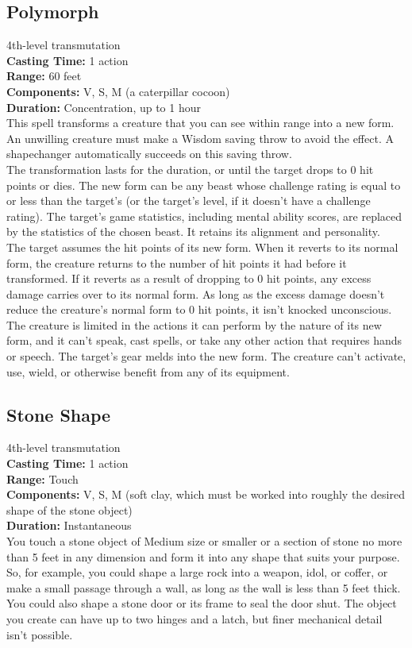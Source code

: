 \documentclass[11pt, A4paper, english]{article}
\begin{document}
		\subsection{Polymorph}
4th-level transmutation \\
\textbf{Casting Time:} 1 action \\
\textbf{Range:} 60 feet \\
\textbf{Components:} V, S, M (a caterpillar cocoon) \\
\textbf{Duration:} Concentration, up to 1 hour \\
This spell transforms a creature that you can see within range into a new form. An unwilling creature must make a Wisdom saving throw to avoid the effect. A shapechanger automatically succeeds on this saving throw. \\
The transformation lasts for the duration, or until the target drops to 0 hit points or dies. The new form can be any beast whose challenge rating is equal to or less than the target’s (or the target’s level, if it doesn't have a challenge rating). The target's game statistics, including mental ability scores, are replaced by the statistics of the chosen beast. It retains its alignment and personality. \\
The target assumes the hit points of its new form. When it reverts to its normal form, the creature returns to the number of hit points it had before it transformed. If it reverts as a result of dropping to 0 hit points, any excess damage carries over to its normal form. As long as the excess damage doesn't reduce the creature’s normal form to 0 hit points, it isn't knocked unconscious. \\
The creature is limited in the actions it can perform by the nature of its new form, and it can’t speak, cast spells, or take any other action that requires hands or speech. The target’s gear melds into the new form. The creature can’t activate, use, wield, or otherwise benefit from any of its equipment.

		\subsection{Stone Shape}
4th-level transmutation \\
\textbf{Casting Time:} 1 action \\
\textbf{Range:} Touch \\
\textbf{Components:} V, S, M (soft clay, which must be worked into roughly the desired shape of the stone object) \\
\textbf{Duration:} Instantaneous \\
You touch a stone object of Medium size or smaller or a section of stone no more than 5 feet in any dimension and form it into any shape that suits your purpose. So, for example, you could shape a large rock into a weapon, idol, or coffer, or make a small passage through a wall, as long as the wall is less than 5 feet thick. You could also shape a stone door or its frame to seal the door shut. The object you create can have up to two hinges and a latch, but finer mechanical detail isn't possible.
\end{document}
